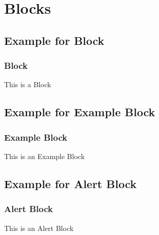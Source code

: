 \documentclass{beamer}
\begin{document}
\section{Blocks}
\subsection{Example for Block}
\begin{frame}
\frametitle{Block}
\begin{block}{This is a Block}
\blindtext
\end{block}
\end{frame}

\subsection{Example for Example Block}
\begin{frame}
\frametitle{Example Block}
\begin{exampleblock}{This is an Example Block}
\blindtext
\end{exampleblock}
\end{frame}

\subsection{Example for Alert Block}
\begin{frame}
\frametitle{Alert Block}
\begin{alertblock}{This is an Alert Block}
\blindtext
\end{alertblock}
\end{frame}
\end{document}
